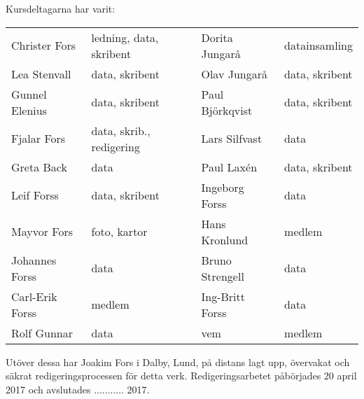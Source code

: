 Kursdeltagarna har varit:
\begin{center}
  \begin{tabular}{l l l l}
    Christer Fors & ledning, data, skribent & Dorita Jungarå & datainsamling \\
    Lea Stenvall & data, skribent & Olav Jungarå & data, skribent \\
    Gunnel Elenius & data, skribent & Paul Björkqvist & data, skribent \\
    Fjalar Fors & data, skrib., redigering & Lars Silfvast & data \\
    Greta Back & data & Paul Laxén & data, skribent \\
    Leif Forss & data, skribent & Ingeborg Forss & data \\
    Mayvor Fors & foto, kartor & Hans Kronlund & medlem \\
    Johannes Forss & data & Bruno Strengell & data \\
    Carl-Erik Forss & medlem & Ing-Britt Forss & data \\
    Rolf Gunnar & data & vem & medlem \\
  \end{tabular}
\end{center}
Utöver dessa har Joakim Fors i Dalby, Lund, på distans lagt upp, övervakat och säkrat redigeringsprocessen för detta verk. Redigeringsarbetet påbörjades 20 april 2017 och avslutades ........... 2017.
